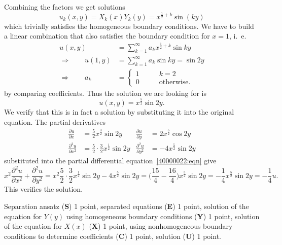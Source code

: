 \begin{loesung}
Combining the factors we get solutions
\[
u_k(x,y) = X_k(x) Y_k(y) = x^{\frac12+k} \sin(ky)
\]
which trivially satisfies the homogeneous boundary conditions.
We have to build a linear combination that also satisfies the 
boundary condition for $x=1$, i.~e.
\begin{align*}
u(x,y)
&=
\sum_{k=1}^\infty a_k x^{\frac12+k}\sin ky 
\\
\Rightarrow\qquad
u(1,y)
&=
\sum_{k=1}^\infty a_k \sin ky = \sin 2y
\\
\Rightarrow\qquad
a_k&=\begin{cases}
1&\qquad k=2\\
0&\qquad\text{otherwise}.
\end{cases}
\end{align*}
by comparing coefficients.
Thus the solution we are looking for is
\[
u(x,y) = x^{\frac52}\sin 2y.
\]
We verify that this is in fact a solution by substituting it into the
original equation. 
The partial derivatives
\begin{align*}
\frac{\partial u}{\partial x}
&=
\frac52x^{\frac32}\sin 2y
&
\frac{\partial u}{\partial y}
&=
2x^{\frac52} \cos 2y
\\
\frac{\partial^2u}{\partial x^2}
&=
\frac52\cdot\frac32 x^{\frac12}\sin 2y
&
\frac{\partial^2u}{\partial y^2}
&=
-4x^{\frac52}\sin 2y
\end{align*}
substituted into the partial differential equation~\eqref{40000022:eqn}
give
\[
x^2\frac{\partial^2u}{\partial x^2}+\frac{\partial^2 u}{\partial y^2}
=
x^2
\frac52\cdot\frac32 x^{\frac12}\sin 2y
-4x^{\frac52}\sin 2y
=
\biggl(\frac{15}4-\frac{16}{4}\biggr)
x^{\frac52}\sin 2y
=
-\frac14 x^{\frac52}\sin 2y = -\frac14u.
\]
This verifies the solution.
\end{loesung}

\begin{bewertung}
Separation ansatz ({\bf S}) 1 point,
separated equations ({\bf E}) 1 point,
solution of the equation for $Y(y)$ using homogeneous boundary conditions
({\bf Y}) 1 point,
solution of the equation for $X(x)$ ({\bf X}) 1 point,
using nonhomogeneous boundary conditions to determine coefficients ({\bf C})
1 point,
solution ({\bf U}) 1 point.
\end{bewertung}





